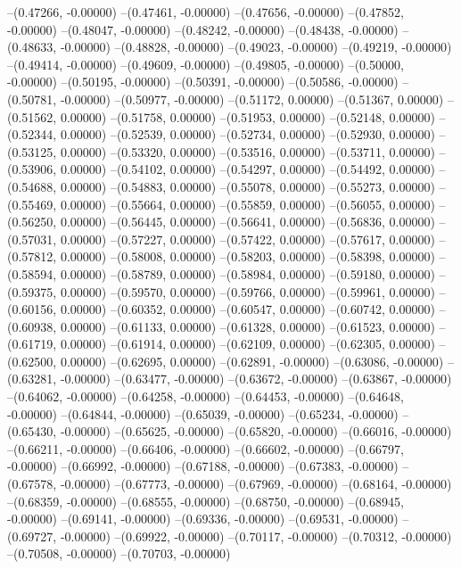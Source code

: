 --(0.47266, -0.00000)
--(0.47461, -0.00000)
--(0.47656, -0.00000)
--(0.47852, -0.00000)
--(0.48047, -0.00000)
--(0.48242, -0.00000)
--(0.48438, -0.00000)
--(0.48633, -0.00000)
--(0.48828, -0.00000)
--(0.49023, -0.00000)
--(0.49219, -0.00000)
--(0.49414, -0.00000)
--(0.49609, -0.00000)
--(0.49805, -0.00000)
--(0.50000, -0.00000)
--(0.50195, -0.00000)
--(0.50391, -0.00000)
--(0.50586, -0.00000)
--(0.50781, -0.00000)
--(0.50977, -0.00000)
--(0.51172, 0.00000)
--(0.51367, 0.00000)
--(0.51562, 0.00000)
--(0.51758, 0.00000)
--(0.51953, 0.00000)
--(0.52148, 0.00000)
--(0.52344, 0.00000)
--(0.52539, 0.00000)
--(0.52734, 0.00000)
--(0.52930, 0.00000)
--(0.53125, 0.00000)
--(0.53320, 0.00000)
--(0.53516, 0.00000)
--(0.53711, 0.00000)
--(0.53906, 0.00000)
--(0.54102, 0.00000)
--(0.54297, 0.00000)
--(0.54492, 0.00000)
--(0.54688, 0.00000)
--(0.54883, 0.00000)
--(0.55078, 0.00000)
--(0.55273, 0.00000)
--(0.55469, 0.00000)
--(0.55664, 0.00000)
--(0.55859, 0.00000)
--(0.56055, 0.00000)
--(0.56250, 0.00000)
--(0.56445, 0.00000)
--(0.56641, 0.00000)
--(0.56836, 0.00000)
--(0.57031, 0.00000)
--(0.57227, 0.00000)
--(0.57422, 0.00000)
--(0.57617, 0.00000)
--(0.57812, 0.00000)
--(0.58008, 0.00000)
--(0.58203, 0.00000)
--(0.58398, 0.00000)
--(0.58594, 0.00000)
--(0.58789, 0.00000)
--(0.58984, 0.00000)
--(0.59180, 0.00000)
--(0.59375, 0.00000)
--(0.59570, 0.00000)
--(0.59766, 0.00000)
--(0.59961, 0.00000)
--(0.60156, 0.00000)
--(0.60352, 0.00000)
--(0.60547, 0.00000)
--(0.60742, 0.00000)
--(0.60938, 0.00000)
--(0.61133, 0.00000)
--(0.61328, 0.00000)
--(0.61523, 0.00000)
--(0.61719, 0.00000)
--(0.61914, 0.00000)
--(0.62109, 0.00000)
--(0.62305, 0.00000)
--(0.62500, 0.00000)
--(0.62695, 0.00000)
--(0.62891, -0.00000)
--(0.63086, -0.00000)
--(0.63281, -0.00000)
--(0.63477, -0.00000)
--(0.63672, -0.00000)
--(0.63867, -0.00000)
--(0.64062, -0.00000)
--(0.64258, -0.00000)
--(0.64453, -0.00000)
--(0.64648, -0.00000)
--(0.64844, -0.00000)
--(0.65039, -0.00000)
--(0.65234, -0.00000)
--(0.65430, -0.00000)
--(0.65625, -0.00000)
--(0.65820, -0.00000)
--(0.66016, -0.00000)
--(0.66211, -0.00000)
--(0.66406, -0.00000)
--(0.66602, -0.00000)
--(0.66797, -0.00000)
--(0.66992, -0.00000)
--(0.67188, -0.00000)
--(0.67383, -0.00000)
--(0.67578, -0.00000)
--(0.67773, -0.00000)
--(0.67969, -0.00000)
--(0.68164, -0.00000)
--(0.68359, -0.00000)
--(0.68555, -0.00000)
--(0.68750, -0.00000)
--(0.68945, -0.00000)
--(0.69141, -0.00000)
--(0.69336, -0.00000)
--(0.69531, -0.00000)
--(0.69727, -0.00000)
--(0.69922, -0.00000)
--(0.70117, -0.00000)
--(0.70312, -0.00000)
--(0.70508, -0.00000)
--(0.70703, -0.00000)
